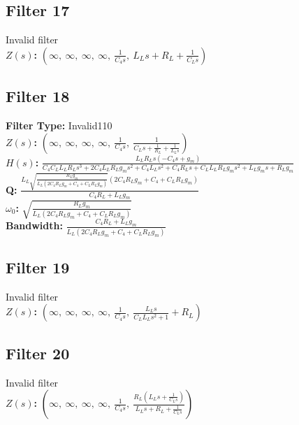 \documentclass{article}
\begin{document}
\subsection*{Filter 17}
Invalid filter \\ 
\textbf{$Z(s)$:} $\left( \infty, \  \infty, \  \infty, \  \infty, \  \frac{1}{C_{4} s}, \  L_{L} s + R_{L} + \frac{1}{C_{L} s}\right)$ \\ 
\subsection*{Filter 18}
\textbf{Filter Type:} Invalid110 \\ 
\textbf{$Z(s)$:} $\left( \infty, \  \infty, \  \infty, \  \infty, \  \frac{1}{C_{4} s}, \  \frac{1}{C_{L} s + \frac{1}{R_{L}} + \frac{1}{L_{L} s}}\right)$ \\ 
\textbf{$H(s)$:} $\frac{L_{L} R_{L} s \left(- C_{4} s + g_{m}\right)}{C_{4} C_{L} L_{L} R_{L} s^{3} + 2 C_{4} L_{L} R_{L} g_{m} s^{2} + C_{4} L_{L} s^{2} + C_{4} R_{L} s + C_{L} L_{L} R_{L} g_{m} s^{2} + L_{L} g_{m} s + R_{L} g_{m}}$ \\ 
\textbf{Q:} $\frac{L_{L} \sqrt{\frac{R_{L} g_{m}}{L_{L} \left(2 C_{4} R_{L} g_{m} + C_{4} + C_{L} R_{L} g_{m}\right)}} \left(2 C_{4} R_{L} g_{m} + C_{4} + C_{L} R_{L} g_{m}\right)}{C_{4} R_{L} + L_{L} g_{m}}$ \\ 
\textbf{$\omega_0$:} $\sqrt{\frac{R_{L} g_{m}}{L_{L} \left(2 C_{4} R_{L} g_{m} + C_{4} + C_{L} R_{L} g_{m}\right)}}$ \\ 
\textbf{Bandwidth:} $\frac{C_{4} R_{L} + L_{L} g_{m}}{L_{L} \left(2 C_{4} R_{L} g_{m} + C_{4} + C_{L} R_{L} g_{m}\right)}$ \\ 
\subsection*{Filter 19}
Invalid filter \\ 
\textbf{$Z(s)$:} $\left( \infty, \  \infty, \  \infty, \  \infty, \  \frac{1}{C_{4} s}, \  \frac{L_{L} s}{C_{L} L_{L} s^{2} + 1} + R_{L}\right)$ \\ 
\subsection*{Filter 20}
Invalid filter \\ 
\textbf{$Z(s)$:} $\left( \infty, \  \infty, \  \infty, \  \infty, \  \frac{1}{C_{4} s}, \  \frac{R_{L} \left(L_{L} s + \frac{1}{C_{L} s}\right)}{L_{L} s + R_{L} + \frac{1}{C_{L} s}}\right)$ \\ 
\end{document}
